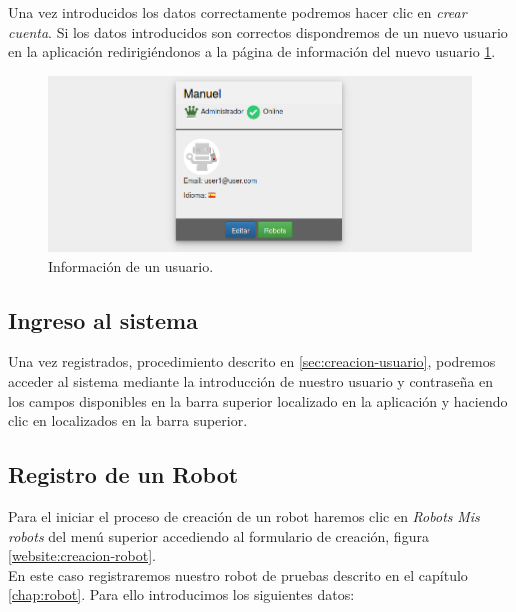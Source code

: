 Una vez introducidos los datos correctamente podremos hacer clic en \emph{crear cuenta}. Si los datos introducidos son correctos dispondremos de un nuevo usuario en la aplicación redirigiéndonos
a la página de información del nuevo usuario
\ref{website:informacion-usuario}.

\begin{figure}[H]
  \begin{center}
    \includegraphics[scale=0.4]{imagenes/manual-usuario/informacion-usuario.png}
  \end{center}
  \caption{Información de un usuario.}
  \label{website:informacion-usuario}
\end{figure}



\subsection{ Ingreso al sistema }
\label{sec:ingreso-sisetma}

Una vez registrados, procedimiento descrito en \ref{sec:creacion-usuario}, podremos acceder al sistema mediante la introducción de nuestro usuario y contraseña en los campos disponibles en la barra
superior localizado en la aplicación y haciendo clic en  localizados en la barra superior.\\

\subsection{Registro de un Robot}
\label{sec:creacion-robot}

Para el iniciar el proceso de creación de un robot haremos clic en \emph{Robots} \textrightarrow \enspace \emph{Mis robots} del menú superior accediendo al formulario de creación, figura
\ref{website:creacion-robot}.\\

En este caso registraremos nuestro robot de pruebas descrito en el capítulo \ref{chap:robot}. Para ello introducimos los siguientes datos:\\


